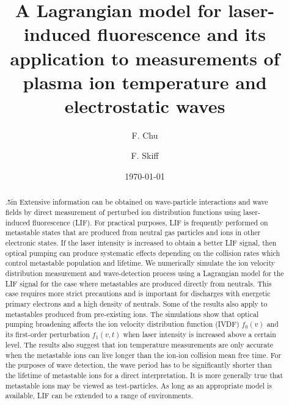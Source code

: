 \documentclass[aip,pop,reprint]{revtex4-1}
\begin{document}
\title{A Lagrangian model for laser-induced fluorescence and its application to measurements of plasma ion temperature and electrostatic waves} 
\author{F. Chu}
\author{F. Skiff}
\date{\today}

\begin{abstract}
\rightskip.5in
Extensive information can be obtained on wave-particle interactions and wave fields by direct measurement of perturbed ion distribution functions using laser-induced fluorescence (LIF). For practical purposes, LIF is frequently performed on metastable states that are produced from neutral gas particles and ions in other electronic states. If the laser intensity is increased to obtain a better LIF signal, then optical pumping can produce systematic effects depending on the collision rates which control metastable population and lifetime. We numerically simulate the ion velocity distribution measurement and wave-detection process using a Lagrangian model for the LIF signal for the case where metastables are produced directly from neutrals. This case requires more strict precautions and is important for discharges with energetic primary electrons and a high density of neutrals. Some of the results also apply to metastables produced from pre-existing ions. The simulations show that optical pumping broadening affects the ion velocity distribution function (IVDF) $f_0(v)$ and its first-order perturbation $f_1(v,t)$ when laser intensity is increased above a certain level. The results also suggest that ion temperature measurements are only accurate when the metastable ions can live longer than the ion-ion collision mean free time. For the purposes of wave detection, the wave period has to be significantly shorter than the lifetime of metastable ions for a direct interpretation. It is more generally true that metastable ions may be viewed as test-particles. As long as an appropriate model is available, LIF can be extended to a range of environments. 

\end{abstract}

\maketitle
\end{document}
